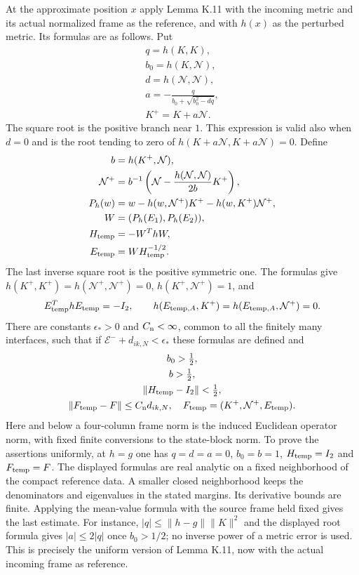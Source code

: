 \documentclass[
  english,
  11pt,
  reqno]{amsart}
\begin{document}
At the approximate position \(x\) apply Lemma K.11 with the incoming
metric and its actual normalized frame as the reference, and with
\(h(x)\) as the perturbed metric. Its formulas are as follows. Put \[
 \begin{gathered}
q=h(K,K), \\
b_0=h(K,\mathcal N), \\
d=h(\mathcal N,\mathcal N), \\
a=-\frac{q}{b_0+\sqrt{b_0^2-dq}}, \\
K^+=K+a\mathcal N.
\end{gathered}
\] The square root is the positive branch near \(1\). This expression is
valid also when \(d=0\) and is the root tending to zero of
\(h(K+a\mathcal N,K+a\mathcal N)=0\). Define \[
 \begin{aligned}
b&=h(K^+,\mathcal N), \\
\mathcal N^+&=b^{-1}\left(\mathcal N-\frac{h(\mathcal N,\mathcal N)}{2b}K^+\right), \\
P_h(w)&=w-h(w,\mathcal N^+)K^+-h(w,K^+)\mathcal N^+, \\
W&=(P_h(E_1),P_h(E_2)), \\
H_{\rm temp}&=-W^ThW, \\
E_{\rm temp}&=W H_{\rm temp}^{-1/2}.
\end{aligned}
\] The last inverse square root is the positive symmetric one. The
formulas give \(h(K^+,K^+)=h(\mathcal N^+,\mathcal N^+)=0\),
\(h(K^+,\mathcal N^+)=1\), and \[
 E_{\rm temp}^ThE_{\rm temp}=-I_2,\qquad
 h(E_{{\rm temp},A},K^+)=h(E_{{\rm temp},A},\mathcal N^+)=0.
\] There are constants \(\epsilon_*>0\) and \(C_{\rm n}<\infty\), common
to all the finitely many interfaces, such that if
\(\mathcal E^-+d_{ik,N}<\epsilon_*\) these formulas are defined and \[
 \begin{gathered}
b_0>\tfrac12, \\
b>\tfrac12, \\
\|H_{\rm temp}-I_2\|<\tfrac12, \\
\|F_{\rm temp}-F\|\le C_{\rm n}d_{ik,N},
 \quad F_{\rm temp}=(K^+,\mathcal N^+,E_{\rm temp}).
\end{gathered}
\] Here and below a four-column frame norm is the induced Euclidean
operator norm, with fixed finite conversions to the state-block norm. To
prove the assertions uniformly, at \(h=g\) one has \(q=d=a=0\),
\(b_0=b=1\), \(H_{\rm temp}=I_2\) and \(F_{\rm temp}=F\). The displayed
formulas are real analytic on a fixed neighborhood of the compact
reference data. A smaller closed neighborhood keeps the denominators and
eigenvalues in the stated margins. Its derivative bounds are finite.
Applying the mean-value formula with the source frame held fixed gives
the last estimate. For instance, \(|q|\le\|h-g\|\|K\|^2\) and the
displayed root formula gives \(|a|\le2|q|\) once \(b_0>1/2\); no inverse
power of a metric error is used. This is precisely the uniform version
of Lemma K.11, now with the actual incoming frame as reference.
\end{document}
